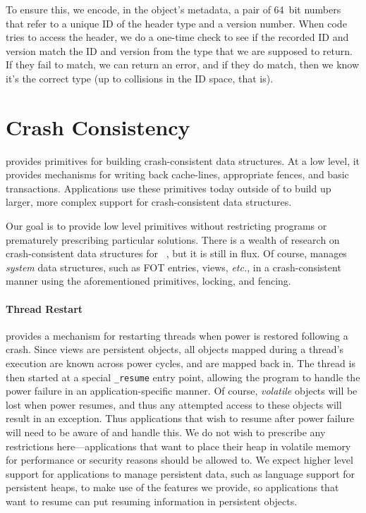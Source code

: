 To ensure this, we encode, in the object's metadata, a pair of 64~bit numbers that refer to a unique ID of the header
type and a version number. When code tries to access the header, we do a one-time check to see if the
recorded ID and version match the ID and version from the type that we are supposed to return. If they fail to match, we
can return an error, and if they do match, then we know it's the correct type (up to collisions in the ID space, that is).

\section{Crash Consistency}
\label{sec:crash}

\Twizzler provides primitives for building crash-consistent data structures. At a low level,
it provides mechanisms for writing back cache-lines, appropriate fences, and basic transactions.
Applications use these primitives today outside of \Twizzler to build up larger, more complex support for
crash-consistent data structures.


Our goal is to provide low level primitives without restricting programs or prematurely
prescribing particular solutions. There is a wealth of research on crash-consistent
data structures for
\NVM~\cite{condit:sosp09,coburn:asplos11,volos:asplos11,dulloor:eurosys14,narayanan:asplos12,ni:hotstorage18,ni:micro19,ogleari:hpca18,lu2014loose},
but it is still in flux. Of course, \Twizzler manages \emph{system} data structures,
such as FOT entries, views, \emph{etc.}, in a
crash-consistent manner using the aforementioned primitives, locking, and fencing.

\paragraph{Thread Restart}

\Twizzler provides a mechanism for restarting threads when power is restored following a crash.
Since views are persistent objects, all objects mapped during a thread's execution are known across
power cycles, and are mapped back in. The thread is then started at a special \texttt{\_resume}
entry point, allowing the program to handle the power failure in an application-specific manner.  Of
course, \emph{volatile} objects will be lost when power resumes, and thus any attempted access to
these objects will result in an exception. Thus applications that wish to resume after power failure
will need to be aware of and handle this. We do not wish to prescribe any restrictions
here---applications that want to place their heap in volatile memory for performance or security
reasons should be allowed to. We expect higher level support for applications to manage persistent
data, such as language support for persistent heaps, to make use of the features we provide, so
applications that want to resume can put resuming information in persistent objects.

